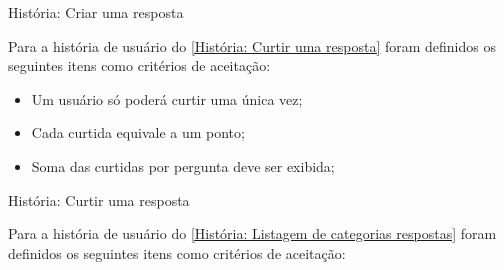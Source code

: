 \def\arraystretch{2}
\begin{quadro}[htb]
\centering
\ABNTEXfontereduzida
\caption[História: Criar uma resposta]{História: Criar uma resposta}
\label{História: Criar uma resposta}
\end{quadro}
\FloatBarrier 

Para a história de usuário do \autoref{História: Curtir uma resposta} foram definidos os seguintes itens como critérios de aceitação:

\begin{itemize}
\item Um usuário só poderá curtir uma única vez;
\item Cada curtida equivale a um ponto;
\item Soma das curtidas por pergunta deve ser exibida;
\end{itemize}

\def\arraystretch{2}
\begin{quadro}[htb]
\centering
\ABNTEXfontereduzida
\caption[História: Curtir uma resposta]{História: Curtir uma resposta}
\label{História: Curtir uma resposta}
\end{quadro}
\FloatBarrier 

Para a história de usuário do \autoref{História: Listagem de categorias respostas} foram definidos os seguintes itens como critérios de aceitação:


